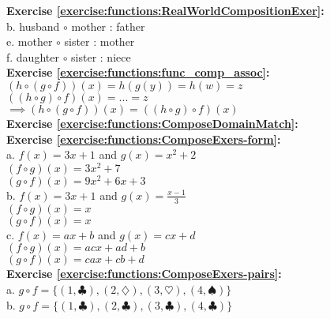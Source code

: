 
\noindent\textbf{Exercise \ref{exercise:functions:RealWorldCompositionExer}:}\\
b. husband $\circ$ mother : father\\
e. mother $\circ$ sister : mother\\
f. daughter $\circ$ sister : niece\\

\noindent\textbf{Exercise \ref{exercise:functions:func_comp_assoc}:}\\
$(h\circ(g\circ f))(x)=h(g(y))=h(w)=z$\\
$((h\circ g)\circ f)(x)=...=z$\\
$\implies (h\circ(g\circ f))(x)=((h\circ g)\circ f)(x)$\\

\noindent\textbf{Exercise \ref{exercise:functions:ComposeDomainMatch}:}\\

\noindent\textbf{Exercise \ref{exercise:functions:ComposeExers-form}:}\\
a. $f(x)=3x+1$ and $g(x)=x^2+2$\\
$(f\circ g)(x)=3x^2+7$\\
$(g\circ f)(x)=9x^2+6x+3$\\
b. $f(x)=3x+1$ and $g(x)=\displaystyle\frac{x-1}{3}$\\
$(f\circ g)(x)=x$\\
$(g\circ f)(x)=x$\\
c. $f(x)=ax+b$ and $g(x)=cx+d$\\
$(f\circ g)(x)=acx+ad+b$\\
$(g\circ f)(x)=cax+cb+d$\\

\noindent\textbf{Exercise \ref{exercise:functions:ComposeExers-pairs}:}\\
a. $g\circ f=\{(1,\clubsuit),(2,\diamondsuit),(3,\heartsuit),(4,\spadesuit)\}$\\
b. $g\circ f=\{(1,\clubsuit),(2,\clubsuit),(3,\clubsuit),(4,\clubsuit)\}$\\


